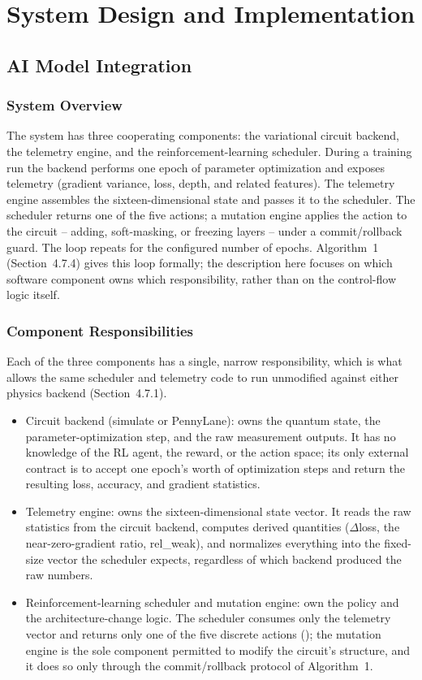 \section{System Design and Implementation}
\subsection{AI Model Integration}

\subsubsection{System Overview}
The system has three cooperating components: the variational circuit backend, the telemetry engine, and the reinforcement-learning scheduler. During a training run the backend performs one epoch of parameter optimization and exposes telemetry (gradient variance, loss, depth, and related features). The telemetry engine assembles the sixteen-dimensional state and passes it to the scheduler. The scheduler returns one of the five actions; a mutation engine applies the action to the circuit -- adding, soft-masking, or freezing layers -- under a commit/rollback guard. The loop repeats for the configured number of epochs. Algorithm~1 (Section~4.7.4) gives this loop formally; the description here focuses on which software component owns which responsibility, rather than on the control-flow logic itself.

\subsubsection{Component Responsibilities}
Each of the three components has a single, narrow responsibility, which is what allows the same scheduler and telemetry code to run unmodified against either physics backend (Section~4.7.1).

\begin{itemize}
\item Circuit backend (simulate or PennyLane): owns the quantum state, the parameter-optimization step, and the raw measurement outputs. It has no knowledge of the RL agent, the reward, or the action space; its only external contract is to accept one epoch's worth of optimization steps and return the resulting loss, accuracy, and gradient statistics.
\item Telemetry engine: owns the sixteen-dimensional state vector. It reads the raw statistics from the circuit backend, computes derived quantities ($\Delta$loss, the near-zero-gradient ratio, rel\_weak), and normalizes everything into the fixed-size vector the scheduler expects, regardless of which backend produced the raw numbers.
\item Reinforcement-learning scheduler and mutation engine: own the policy and the architecture-change logic. The scheduler consumes only the telemetry vector and returns only one of the five discrete actions (); the mutation engine is the sole component permitted to modify the circuit's structure, and it does so only through the commit/rollback protocol of Algorithm~1.
\end{itemize}

